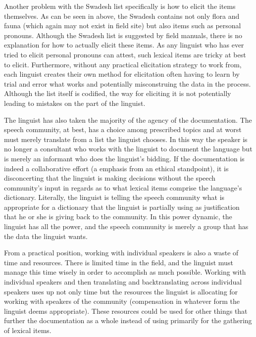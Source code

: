 \documentclass[output=paper,
modfonts
]{langscibook}
\begin{document}
Another  problem with the Swadesh list specifically is how to elicit the items themselves. As can be seen in  above, the Swadesh contains not only flora and fauna (which again may not exist in field site) but also items such as personal pronouns. Although the Swadesh list is suggested by field manuals, there is no explanation for how to actually elicit these items. As any linguist who has ever tried to elicit personal pronouns can attest, such lexical items are tricky at best to elicit. Furthermore, without any practical elicitation strategy to work from, each linguist creates their own method for elicitation often having to learn by trial and error what works and potentially misconstruing the data in the process. Although the list itself is codified, the way for eliciting it is not potentially leading to mistakes on the part of the linguist.  

The linguist has also taken the majority of the agency of the documentation. The speech community, at best, has a choice among prescribed topics and at worst must merely translate from a list the linguist chooses. In this way the speaker is no longer a consultant who works with the linguist to document the language but is merely an informant who does the linguist’s bidding. If the documentation is indeed a collaborative effort (a  emphasis from an ethical standpoint), it is disconcerting that the linguist is making decisions without the speech community’s input in regards as to what lexical items comprise the language’s dictionary. Literally, the linguist is telling the speech community what is appropriate for a dictionary that the linguist is partially using as justification that he or she is giving back to the community. In this power dynamic, the linguist has all the power, and the speech community is merely a group that has the data the linguist wants. 

From a practical position, working with individual speakers is also a waste of time and resources. There is limited time in the field, and the linguist must manage this time wisely in order to accomplish as much possible. Working with individual speakers and then translating and backtranslating across individual speakers uses up not only time but the resources the linguist is allocating for working with speakers of the community (compensation in whatever form the linguist deems appropriate). These resources could be used for other things that further the documentation as a whole instead of using primarily for the gathering of lexical items. 
\end{document}
